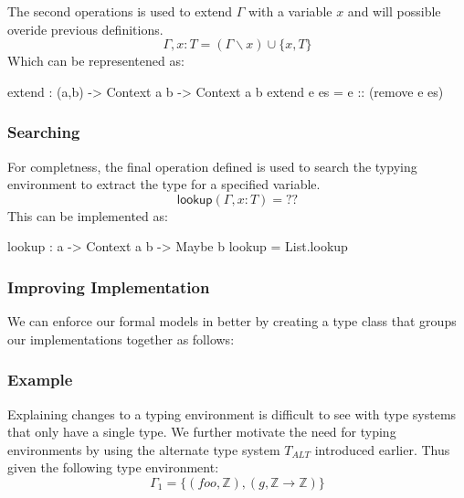 The second operations is used to extend $\Gamma$ with a variable $x$ and will possible overide previous definitions.
\[
\Gamma,x:T = (\Gamma\backslash x)\cup\{x,T\}
\]
\noindent
Which can be representened as:
\begin{code}
extend : (a,b) -> Context a b -> Context a b
extend e es = e :: (remove e es)
\end{code}

\subsubsection{Searching}
\label{sec:type:env-operations:lookup}

For completness, the final operation defined is used to search the typying environment to extract the type for a specified variable.
\[
\mathsf{lookup}(\Gamma,x:T) = \text{??}
\]
\noindent
This can be implemented as:
\begin{code}
lookup : a -> Context a b -> Maybe b
lookup = List.lookup
\end{code}

\subsubsection{Improving \idris{} Implementation}
\label{sec:type:env-operations:classes}

We can enforce our formal models in \idris{} better by creating a type class that groups our implementations together as follows:

\subsubsection{Example}
\label{sec:types:example}

Explaining changes to a typing environment is difficult to see with type systems that only have a single type.
We further motivate the need for typing environments by using the alternate type system $T_{ALT}$ introduced earlier.
Thus given the following type environment:
\[
\Gamma_{1}=\{(foo,\mathbb{Z}),(g,\mathbb{Z}\rightarrow\mathbb{Z})\}
\]

